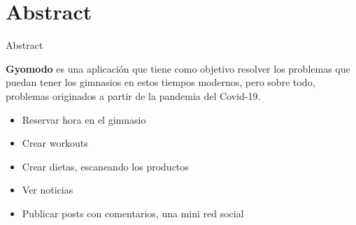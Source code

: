 \documentclass[12pt]{beamer}
\begin{document}
\section{Abstract}
\begin{frame}{Abstract}

\textbf{\color{gymodo_orange} Gyomodo} es una aplicación que tiene como objetivo resolver los problemas que puedan tener los gimnasios en estos tiempos modernos, pero sobre todo, problemas originados a partir de la pandemia del Covid-19.

\begin{itemize}
\item Reservar hora en el gimnasio
\item Crear workouts
\item Crear dietas, escaneando los productos
\item Ver noticias
\item Publicar posts con comentarios, una mini red social
\end{itemize}

\end{frame}
\end{document}
